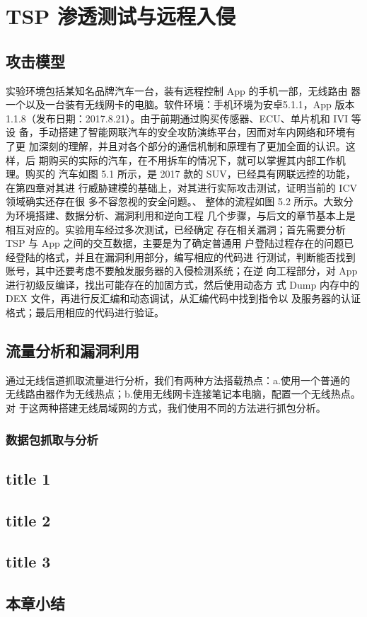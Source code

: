 \chapter{TSP 渗透测试与远程入侵}
\label{ch5}
\section{攻击模型}
实验环境包括某知名品牌汽车一台，装有远程控制 App 的手机一部，无线路由
器一个以及一台装有无线网卡的电脑。软件环境：手机环境为安卓5.1.1，App 版本
1.1.8（发布日期：2017.8.21）。由于前期通过购买传感器、ECU、单片机和 IVI 等设
备，手动搭建了智能网联汽车的安全攻防演练平台，因而对车内网络和环境有了更
加深刻的理解，并且对各个部分的通信机制和原理有了更加全面的认识。这样，后
期购买的实际的汽车，在不用拆车的情况下，就可以掌握其内部工作机理。购买的
汽车如图 5.1 所示，是 2017 款的 SUV，已经具有网联远控的功能，在第四章对其进
行威胁建模的基础上，对其进行实际攻击测试，证明当前的 ICV 领域确实还存在很
多不容忽视的安全问题。、
\newline
整体的流程如图 5.2 所示。大致分为环境搭建、数据分析、漏洞利用和逆向工程
几个步骤，与后文的章节基本上是相互对应的。实验用车经过多次测试，已经确定
存在相关漏洞；首先需要分析 TSP 与 App 之间的交互数据，主要是为了确定普通用
户登陆过程存在的问题已经登陆的格式，并且在漏洞利用部分，编写相应的代码进
行测试，判断能否找到账号，其中还要考虑不要触发服务器的入侵检测系统；在逆
向工程部分，对 App 进行初级反编译，找出可能存在的加固方式，然后使用动态方
式 Dump 内存中的 DEX 文件，再进行反汇编和动态调试，从汇编代码中找到指令以
及服务器的认证格式；最后用相应的代码进行验证。
\newline

\section{流量分析和漏洞利用}
通过无线信道抓取流量进行分析，我们有两种方法搭载热点：a.使用一个普通的
无线路由器作为无线热点；b.使用无线网卡连接笔记本电脑，配置一个无线热点。对
于这两种搭建无线局域网的方式，我们使用不同的方法进行抓包分析。

\subsection[]{数据包抓取与分析
}

\section{title 1}
\section{title 2}
\section{title 3}
\section{本章小结}